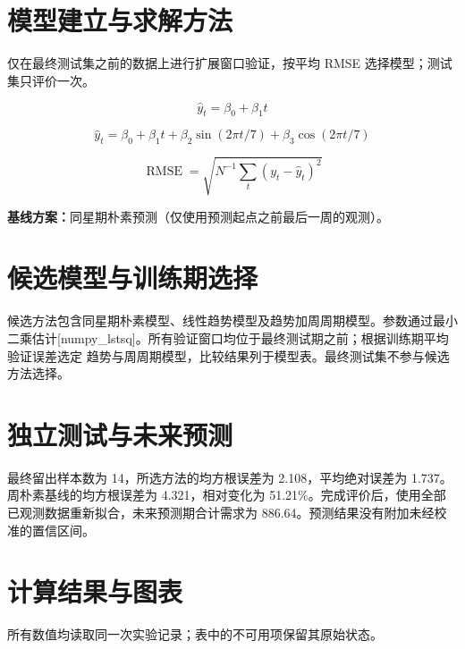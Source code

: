 \documentclass[UTF8,a4paper,11pt,fontset=fandol]{ctexart}
\begin{document}
\section{模型建立与求解方法}
仅在最终测试集之前的数据上进行扩展窗口验证，按平均 RMSE 选择模型；测试集只评价一次。

\begin{equation}
\widehat y_t=\beta_0+\beta_1t
\end{equation}

\begin{equation}
\widehat y_t=\beta_0+\beta_1t+\beta_2\sin(2\pi t/7)+\beta_3\cos(2\pi t/7)
\end{equation}

\begin{equation}
\operatorname{RMSE}=\sqrt{N^{-1}\sum_t(y_t-\widehat y_t)^2}
\end{equation}

\noindent\textbf{基线方案：}同星期朴素预测（仅使用预测起点之前最后一周的观测）。


\section{候选模型与训练期选择}
候选方法包含同星期朴素模型、线性趋势模型及趋势加周周期模型。参数通过最小二乘估计[numpy\_lstsq]。所有验证窗口均位于最终测试期之前；根据训练期平均验证误差选定 趋势与周周期模型，比较结果列于模型表。最终测试集不参与候选方法选择。

\section{独立测试与未来预测}
最终留出样本数为 14，所选方法的均方根误差为 2.108，平均绝对误差为 1.737。周朴素基线的均方根误差为 4.321，相对变化为 51.21\%。完成评价后，使用全部已观测数据重新拟合，未来预测期合计需求为 886.64。预测结果没有附加未经校准的置信区间。


\section{计算结果与图表}
所有数值均读取同一次实验记录；表中的不可用项保留其原始状态。

\end{document}
